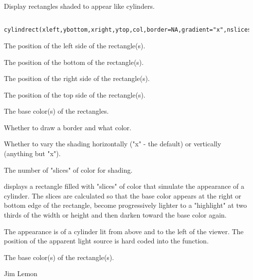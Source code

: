 \begin{Description}\relax
Display rectangles shaded to appear like cylinders.
\end{Description}
\begin{Usage}
\begin{verbatim}
 cylindrect(xleft,ybottom,xright,ytop,col,border=NA,gradient="x",nslices=50)
\end{verbatim}
\end{Usage}
\begin{Arguments}
\begin{ldescription}
\item[\code{xleft}] The position of the left side of the rectangle(s).
\item[\code{ybottom}] The position of the bottom of the rectangle(s).
\item[\code{xright}] The position of the right side of the rectangle(s).
\item[\code{ytop}] The position of the top side of the rectangle(s).
\item[\code{col}] The base color(s) of the rectangles.
\item[\code{border}] Whether to draw a border and what color.
\item[\code{gradient}] Whether to vary the shading horizontally ("x" - the default)
or vertically (anything but "x").
\item[\code{nslices}] The number of "slices" of color for shading.
\end{ldescription}
\end{Arguments}
\begin{Details}\relax
{} displays a rectangle filled with "slices" of color that
simulate the appearance of a cylinder. The slices are calculated so that the 
base color appears at the right or bottom edge of the rectangle, become
progressively lighter to a "highlight" at two thirds of the width or height
and then darken toward the base color again.

The appearance is of a cylinder lit from above and to the left of the viewer.
The position of the apparent light source is hard coded into the function.
\end{Details}
\begin{Value}
The base color(s) of the rectangle(s).
\end{Value}
\begin{Author}\relax
Jim Lemon
\end{Author}
\begin{SeeAlso}\relax
{}
\end{SeeAlso}
\begin{Examples}
\end{Examples}

